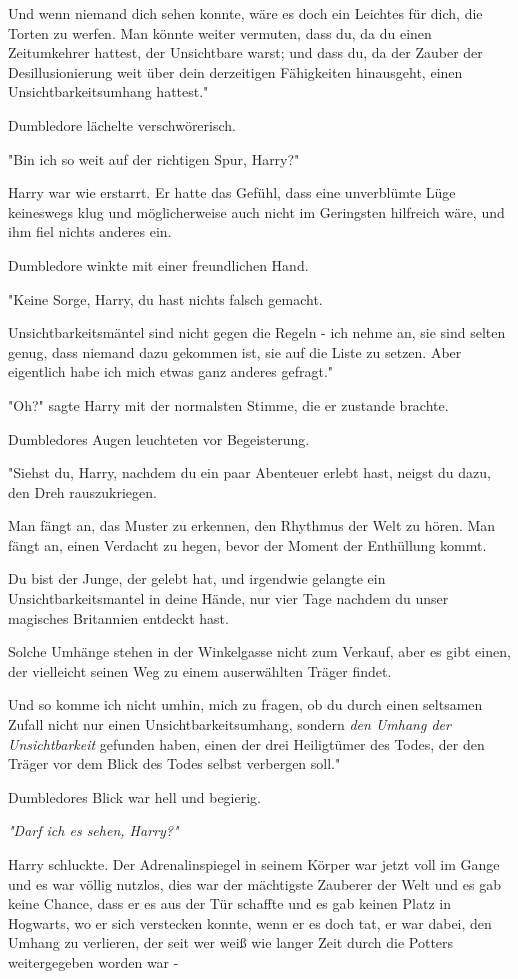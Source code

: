 {Und wenn niemand dich sehen konnte, wäre es doch ein Leichtes für dich, die Torten zu werfen. Man könnte weiter vermuten, dass du, da du einen Zeitumkehrer hattest, der Unsichtbare warst; und dass du, da der Zauber der Desillusionierung weit über dein derzeitigen Fähigkeiten hinausgeht, einen Unsichtbarkeitsumhang hattest."

Dumbledore lächelte verschwörerisch.

"Bin ich so weit auf der richtigen Spur, Harry?"

Harry war wie erstarrt. Er hatte das Gefühl, dass eine unverblümte Lüge keineswegs klug und möglicherweise auch nicht im Geringsten hilfreich wäre, und ihm fiel nichts anderes ein.

Dumbledore winkte mit einer freundlichen Hand.

"Keine Sorge, Harry, du hast nichts falsch gemacht.

Unsichtbarkeitsmäntel sind nicht gegen die Regeln - ich nehme an, sie sind selten genug, dass niemand dazu gekommen ist, sie auf die Liste zu setzen. Aber eigentlich habe ich mich etwas ganz anderes gefragt."

"Oh?" sagte Harry mit der normalsten Stimme, die er zustande brachte.

Dumbledores Augen leuchteten vor Begeisterung.

"Siehst du, Harry, nachdem du ein paar Abenteuer erlebt hast, neigst du dazu, den Dreh rauszukriegen.

Man fängt an, das Muster zu erkennen, den Rhythmus der Welt zu hören. Man fängt an, einen Verdacht zu hegen, bevor der Moment der Enthüllung kommt.

Du bist der Junge, der gelebt hat, und irgendwie gelangte ein Unsichtbarkeitsmantel in deine Hände, nur vier Tage nachdem du unser magisches Britannien entdeckt hast.

Solche Umhänge stehen in der Winkelgasse nicht zum Verkauf, aber es gibt einen, der vielleicht seinen Weg zu einem auserwählten Träger findet.

Und so komme ich nicht umhin, mich zu fragen, ob du durch einen seltsamen Zufall nicht nur einen Unsichtbarkeitsumhang, sondern \emph{den Umhang der Unsichtbarkeit} gefunden haben, einen der drei Heiligtümer des Todes, der den Träger vor dem Blick des Todes selbst verbergen soll."

Dumbledores Blick war hell und begierig.

\emph{"Darf ich es sehen, Harry?"}

Harry schluckte. Der Adrenalinspiegel in seinem Körper war jetzt voll im Gange und es war völlig nutzlos, dies war der mächtigste Zauberer der Welt und es gab keine Chance, dass er es aus der Tür schaffte und es gab keinen Platz in Hogwarts, wo er sich verstecken konnte, wenn er es doch tat, er war dabei, den Umhang zu verlieren, der seit wer weiß wie langer Zeit durch die Potters weitergegeben worden war -

}
